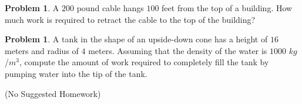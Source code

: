 \documentclass[letterpaper, twoside, 12pt]{book}
\theoremstyle{definition}
\theoremstyle{definition}
\newtheorem{goal}[theorem]{Goal}
\newtheorem{problem}[theorem]{Problem}
\newtheorem{strategy}[theorem]{Strategy}
\begin{document}
\vfill

\newpage

\begin{problem}
  A $200$ pound cable hangs $100$ feet from the top of a building. How much
  work is required to retract the cable to the top of the building?
\end{problem}

\vfill

\begin{problem}
  A tank in the shape of an upside-down cone has a height of $16$ meters and
  radius of $4$ meters. Assuming that the density of the water is $1000$
  $kg$/$m^3$, compute the amount of work required to completely fill the tank
  by pumping water into the tip of the tank.
\end{problem}

\vfill

(No Suggested Homework)






\end{document}
